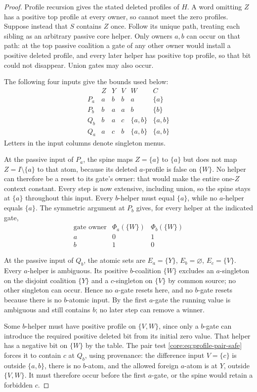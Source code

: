 \begin{proof}
Profile recursion gives the stated deleted profiles of $H$.
A word omitting $Z$ has a positive top profile at every owner, so cannot
meet the zero profiles. Suppose instead that $S$ contains $Z$ once.
Follow its unique path, treating each sibling as an arbitrary passive
core helper. Only owners $a,b$ can occur on that path: at the top passive
coalition a gate of any other owner would install a positive deleted
profile, and every later helper has positive top profile, so that bit
could not disappear. Union gates may also occur.

The following four inputs give the bounds used below:
\[
\begin{array}{c|cccc|c}
 &Z&Y&V&W&C\\\hline
 P_a&a&b&b&a&\{a\}\\
 P_b&b&a&a&b&\{b\}\\
 Q_b&b&a&c&\{a,b\}&\{a,b\}\\
 Q_a&a&c&b&\{a,b\}&\{a,b\}
\end{array}
\]
Letters in the input columns denote singleton menus.

At the passive input of $P_a$, the spine maps $Z=\{a\}$ to $\{a\}$
but does not map $Z=I\setminus\{a\}$ to that atom, because its deleted
$a$-profile is false on $\{W\}$. No helper can therefore be a reset
to its gate's owner: that would make the entire one-$Z$ context constant.
Every step is now extensive, including union, so the spine stays at
$\{a\}$ throughout this input. Every $b$-helper must equal $\{a\}$,
while no $a$-helper equals $\{a\}$. The symmetric argument at $P_b$
gives, for every helper at the indicated gate,
\[
\begin{array}{c|cc}
 \text{gate owner}&\Phi_a(\{W\})&\Phi_b(\{W\})\\\hline
 a&0&1\\
 b&1&0
\end{array}
\]

At the passive input of $Q_b$, the atomic sets are
$E_a=\{Y\}$, $E_b=\varnothing$, $E_c=\{V\}$.
Every $a$-helper is ambiguous. Its positive $b$-coalition $\{W\}$
excludes an $a$-singleton on the disjoint coalition $\{Y\}$ and a
$c$-singleton on $\{V\}$ by common source; no other singleton can
occur. Hence no $a$-gate resets here, and no $b$-gate resets because
there is no $b$-atomic input. By the first $a$-gate the running value
is ambiguous and still contains $b$; no later step can remove a winner.

Some $b$-helper must have positive profile on $\{V,W\}$, since only
a $b$-gate can introduce the required positive deleted bit from its
initial zero value. That helper has a negative bit on $\{W\}$ by the
table. The pair test \eqref{core:eq:profile-pair-safe} forces it to
contain $c$ at $Q_b$, using provenance: the difference input $V=\{c\}$ is outside
$\{a,b\}$, there is no $b$-atom, and the allowed foreign $a$-atom
is at $Y$, outside $\{V,W\}$. It must therefore occur before the first
$a$-gate, or the spine would retain a forbidden $c$.


\end{proof}
